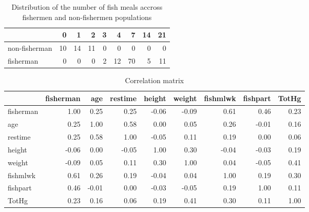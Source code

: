 \documentclass[12pt,]{article}
\begin{document}
\begin{table}[t]

\caption{\label{tab:unnamed-chunk-6}\label{tbl:fishmlwk}Distribution of the number of fish meals accross fishermen and non-fishermen populations}
\centering
\begin{tabular}{lrrrrrrrr}
\toprule
  & 0 & 1 & 2 & 3 & 4 & 7 & 14 & 21\\
\midrule
\rowcolor{gray!6}  non-fisherman & 10 & 14 & 11 & 0 & 0 & 0 & 0 & 0\\
fisherman & 0 & 0 & 0 & 2 & 12 & 70 & 5 & 11\\
\bottomrule
\end{tabular}
\end{table}

\begin{table}[t]

\caption{\label{tab:unnamed-chunk-7}\label{tbl:correlation}Correlation matrix}
\centering
\begin{tabular}{l|r|r|r|r|r|r|r|r}
\hline
  & fisherman & age & restime & height & weight & fishmlwk & fishpart & TotHg\\
\hline
\rowcolor{gray!6}  fisherman & 1.00 & 0.25 & 0.25 & -0.06 & -0.09 & 0.61 & 0.46 & 0.23\\
\hline
age & 0.25 & 1.00 & 0.58 & 0.00 & 0.05 & 0.26 & -0.01 & 0.16\\
\hline
\rowcolor{gray!6}  restime & 0.25 & 0.58 & 1.00 & -0.05 & 0.11 & 0.19 & 0.00 & 0.06\\
\hline
height & -0.06 & 0.00 & -0.05 & 1.00 & 0.30 & -0.04 & -0.03 & 0.19\\
\hline
\rowcolor{gray!6}  weight & -0.09 & 0.05 & 0.11 & 0.30 & 1.00 & 0.04 & -0.05 & 0.41\\
\hline
fishmlwk & 0.61 & 0.26 & 0.19 & -0.04 & 0.04 & 1.00 & 0.19 & 0.30\\
\hline
\rowcolor{gray!6}  fishpart & 0.46 & -0.01 & 0.00 & -0.03 & -0.05 & 0.19 & 1.00 & 0.11\\
\hline
TotHg & 0.23 & 0.16 & 0.06 & 0.19 & 0.41 & 0.30 & 0.11 & 1.00\\
\hline
\end{tabular}
\end{table}
\end{document}
